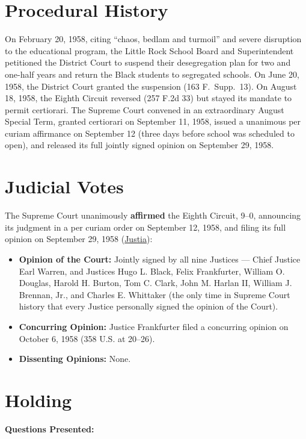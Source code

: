 \documentclass[12pt]{article}
\begin{document}
\section{Procedural History}
On February 20, 1958, citing ``chaos, bedlam and turmoil'' and severe disruption to the educational program, the Little Rock School Board and Superintendent petitioned the District Court to suspend their desegregation plan for two and one-half years and return the Black students to segregated schools. On June 20, 1958, the District Court granted the suspension (163 F.\ Supp.\ 13). On August 18, 1958, the Eighth Circuit reversed (257 F.2d 33) but stayed its mandate to permit certiorari. The Supreme Court convened in an extraordinary August Special Term, granted certiorari on September 11, 1958, issued a unanimous per curiam affirmance on September 12 (three days before school was scheduled to open), and released its full jointly signed opinion on September 29, 1958.

\section{Judicial Votes}
The Supreme Court unanimously \textbf{affirmed} the Eighth Circuit, 9--0, announcing its judgment in a per curiam order on September 12, 1958, and filing its full opinion on September 29, 1958 (\href{https://supreme.justia.com/cases/federal/us/358/1/}{Justia}):

\begin{itemize}

\item \textbf{Opinion of the Court:} Jointly signed by all nine Justices --- Chief Justice Earl Warren, and Justices Hugo L. Black, Felix Frankfurter, William O. Douglas, Harold H. Burton, Tom C. Clark, John M. Harlan II, William J. Brennan, Jr., and Charles E. Whittaker (the only time in Supreme Court history that every Justice personally signed the opinion of the Court).

\item \textbf{Concurring Opinion:} Justice Frankfurter filed a concurring opinion on October 6, 1958 (358 U.S. at 20--26).
    \item \textbf{Dissenting Opinions:} None.
\end{itemize}

\section{Holding}
\textbf{Questions Presented:}
\end{document}
